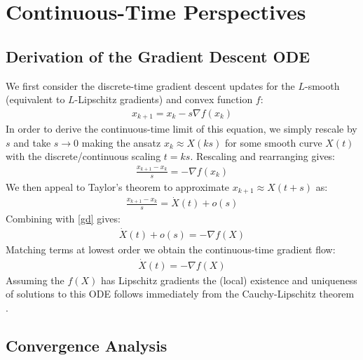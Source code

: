 \section{Continuous-Time Perspectives}
\subsection{Derivation of the Gradient Descent ODE}
We first consider the discrete-time gradient descent updates for the $L$-smooth (equivalent to $L$-Lipschitz gradients) and convex function $f$:
\begin{align*}
    x_{k+1} = x_k - s \nabla f(x_k) 
\end{align*}
In order to derive the continuous-time limit of this equation, we simply rescale by $s$ and take $s \to 0$ making the ansatz $x_k \approx X(ks)$ for some smooth curve $X(t)$ with the discrete/continuous scaling $t=ks$. Rescaling and rearranging gives:
\begin{align}
    \frac{x_{k+1} - x_k}{s} = - \nabla f(x_k) \label{gd}
\end{align}
We then appeal to Taylor's theorem to approximate $x_{k+1} \approx X(t+s)$ as:
\begin{align*}
    \frac{x_{k+1} - x_k}{s} = \dot{X}(t) + o(s)
\end{align*}
Combining with \eqref{gd} gives:
\begin{align*}
    \dot{X}(t) + o(s) = - \nabla f(X)
\end{align*}
Matching terms at lowest order we obtain the continuous-time gradient flow:
\begin{align}
    \dot{X}(t) = -\nabla f(X) \label{gdode}
\end{align}
Assuming the $f(X)$ has Lipschitz gradients the (local) existence and uniqueness of solutions to this ODE follows immediately from the Cauchy-Lipschitz theorem \cite{teschl2012ordinary}.
\subsection{Convergence Analysis}
